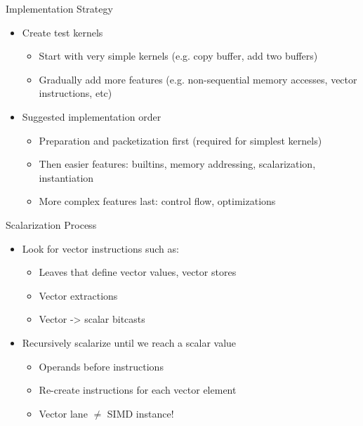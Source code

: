 
\begin{frame}{Implementation Strategy}

\begin{itemize}
    \item Create test kernels
    \begin{itemize}
        \item Start with very simple kernels (e.g. copy buffer, add two buffers)
        \item Gradually add more features (e.g. non-sequential memory accesses, vector instructions, etc)
    \end{itemize}
    
    \item Suggested implementation order
    \begin{itemize}
        \item Preparation and packetization first (required for simplest kernels)
        \item Then easier features: builtins, memory addressing, scalarization, instantiation
        \item More complex features last: control flow, optimizations
    \end{itemize}
\end{itemize}

\end{frame}


\begin{frame}{Scalarization Process}

\begin{itemize}
    \item Look for vector  instructions such as:
    \begin{itemize}
        \item Leaves that define vector values, vector stores
        \item Vector extractions
        \item Vector -> scalar bitcasts
    \end{itemize}
    
    \item Recursively scalarize until we reach a scalar value
    \begin{itemize}
        \item Operands before instructions
        \item Re-create instructions for each vector element
        \item Vector lane $\neq$ SIMD instance!
    \end{itemize}
    
\end{itemize}

\end{frame}

